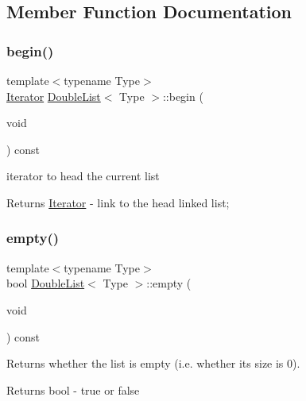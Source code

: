 \subsection{Member Function Documentation}
\mbox{\label{classDoubleList_a63f8896f6da1cd0af88e837260d5bbf0}} 
\subsubsection{\texorpdfstring{begin()}{begin()}}
{\footnotesize\ttfamily template$<$typename Type$>$ \\
\hyperlink{classDoubleList_1_1Iterator}{Iterator} \hyperlink{classDoubleList}{Double\+List}$<$ Type $>$\+::begin (\begin{DoxyParamCaption}\item[{void}]{ }\end{DoxyParamCaption}) const\hspace{0.3cm}{\ttfamily [inline]}}



iterator to head the current list 

\begin{DoxyReturn}{Returns}
\hyperlink{classDoubleList_1_1Iterator}{Iterator} -\/ link to the head linked list; 
\end{DoxyReturn}
\mbox{\label{classDoubleList_a0ab37dfffb686afb02591b1e390043e5}} 
\subsubsection{\texorpdfstring{empty()}{empty()}}
{\footnotesize\ttfamily template$<$typename Type$>$ \\
bool \hyperlink{classDoubleList}{Double\+List}$<$ Type $>$\+::empty (\begin{DoxyParamCaption}\item[{void}]{ }\end{DoxyParamCaption}) const}



Returns whether the list is empty (i.\+e. whether its size is 0). 

\begin{DoxyReturn}{Returns}
bool -\/ true or false 
\end{DoxyReturn}
\mbox{\label{classDoubleList_a701f4210e8adb12facfc29308971c9f6}} 

